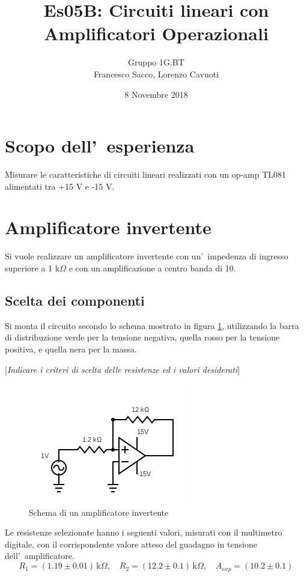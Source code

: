 \documentclass[10pt,a4paper]{article}
\author{Gruppo 1G.BT \\ Francesco Sacco, Lorenzo Cavuoti}
\title{Es05B: Circuiti lineari con Amplificatori Operazionali}
\newcommand{\rem}[1]{[\emph{#1}]}
\begin{document}
\date{8 Novembre 2018}
\maketitle


\section*{Scopo dell'~esperienza}
Misurare le caratteristiche di circuiti lineari realizzati con un op-amp TL081 alimentati tra +15 V e -15 V.

\section{Amplificatore invertente}
Si vuole realizzare un amplificatore invertente con un'~impedenza di ingresso superiore a 1 
k$\Omega$ e con un amplificazione a centro banda di 10.

\subsection{Scelta dei componenti}

Si monta il circuito secondo lo schema mostrato in figura \ref{fig:ampinv}, utilizzando la barra di 
distribuzione verde per la tensione negativa, quella rosso per la tensione positiva, e quella nera per 
la massa.

\rem{Indicare i criteri di scelta delle resistenze ed i valori desiderati}
%
\begin{figure}[h]
\begin{center}
\includegraphics[width=0.4\linewidth]{circuit.png}
\caption{\small Schema di un amplificatore invertente}
\label{fig:ampinv}
\end{center}
\end{figure}
%

Le resistenze selezionate hanno i seguenti valori, misurati con il multimetro digitale, con il corrispondente valore atteso 
del guadagno in tensione dell'~amplificatore.
\[
R_1 = ( 1.19 \pm 0.01) \,\mathrm{k}\Omega, \quad 
R_2 = ( 12.2 \pm 0.1) \,\mathrm{k}\Omega, \quad 
A_{exp} = ( 10.2 \pm 0.1)
\]
\end{document}
